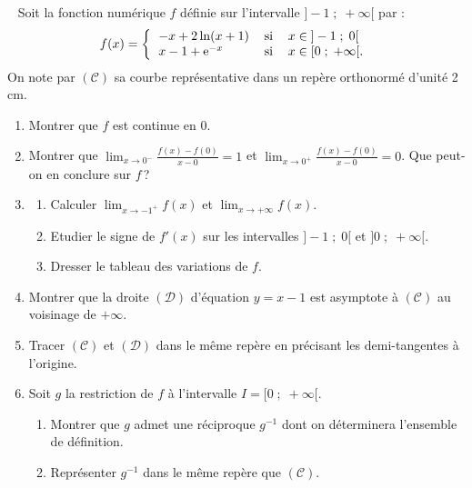 \begin{exo} ~ \newline
Soit la fonction num\'erique $f$ d\'efinie sur l'intervalle $]-1 \; ; \; +\infty[$ par :
\begin{displaymath}
f(x) = 
\left\lbrace
\begin{tabular}{lll}
$ - x + 2 \ln (x + 1) $ & si & $ x \in \; ] -1 \; ; \; 0[ $ \\
$ x - 1 + \expo{-x} $ & si & $ x \in [0 \; ; \; + \infty[ $.
\end{tabular}
\right.
\end{displaymath}
On note par $(\mathscr{C})$ sa courbe repr\'esentative dans un rep\`ere orthonorm\'e \Oij d'unit\'e 2 cm.
\begin{enumerate}
\item Montrer que $f$ est continue en $0$.
\item Montrer que $\lim_{x \rightarrow 0^-} \frac{f(x) - f(0)}{x - 0} = 1$ et 
      $\lim_{x \rightarrow 0^+} \frac{f(x) - f(0)}{x - 0} = 0$.
      Que peut-on en conclure sur $f$\,?
\item \begin{enumerate}
      \item Calculer $\lim_{x \rightarrow -1^+} f(x)$ et $\lim_{x \rightarrow +\infty} f(x)$.
      \item Etudier le signe de $f'(x)$ sur les intervalles $]-1 \; ; \; 0[$ et $] 0 \; ; \; +\infty[$.
      \item Dresser le tableau des variations de $f$.
      \end{enumerate}
\item Montrer que la droite $(\mathcal{D})$ d'\'equation $y = x- 1$ est asymptote \`a $(\mathscr{C})$ au voisinage de $+\infty$.
\item Tracer $(\mathscr{C})$ et $(\mathcal{D})$ dans le m\^eme rep\`ere \Oij en pr\'ecisant les demi-tangentes \`a l'origine.
\item Soit $g$ la restriction de $f$ \`a l'intervalle $I = [ 0 \; ; \; +\infty[$.
      \begin{enumerate}
      \item Montrer que $g$ admet une r\'eciproque $g^{-1}$ dont on d\'eterminera l'ensemble de d\'efinition.
      \item Repr\'esenter $g^{-1}$ dans le m\^eme rep\`ere que $(\mathscr{C})$.
      \end{enumerate}
\end{enumerate}

\end{exo}
